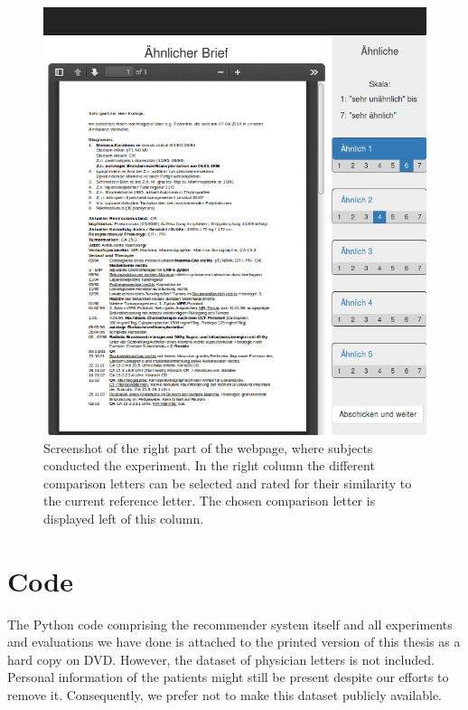 \begin{figure}[h]
	\centering
	\includegraphics[width=0.9\linewidth]{figures/webexperiment_screenshot_right}
	\caption{Screenshot of the right part of the webpage, where subjects conducted the experiment. In the right column the different comparison letters can be selected and rated for their similarity to the current reference letter. The chosen comparison letter is displayed left of this column.}
	\label{fig:webexperiment_right}
\end{figure}

\chapter{Code}
The Python code comprising the recommender system itself and all experiments and evaluations we have done is attached to the printed version of this thesis as a hard copy on DVD. However, the dataset of physician letters is not included. Personal information of the patients might still be present despite our efforts to remove it.  Consequently, we prefer not to make this dataset publicly available.
